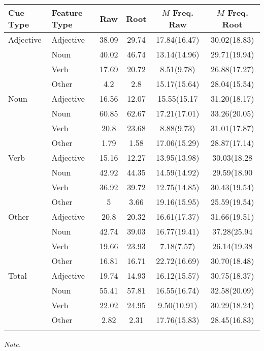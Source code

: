 \documentclass[english,man]{apa6}
\theoremstyle{definition}
\theoremstyle{definition}
\theoremstyle{definition}
\theoremstyle{remark}
\begin{document}
\begin{table}[tbp]
\begin{center}
\begin{threeparttable}
\caption{\label{tab:unnamed-chunk-5}}
\begin{tabular}{llcccc}
\toprule
Cue Type & Feature Type & Raw & Root & $M$ Freq. Raw & $M$ Freq. Root\\
\midrule
Adjective & Adjective & 38.09 & 29.74 & 17.84(16.47) & 30.02(18.83)\\
 & Noun & 40.02 & 46.74 & 13.14(14.96) & 29.71(19.94)\\
 & Verb & 17.69 & 20.72 & 8.51(9.78) & 26.88(17.27)\\
 & Other & 4.2 & 2.8 & 15.17(15.64) & 28.04(15.54)\\
Noun & Adjective & 16.56 & 12.07 & 15.55(15.17 & 31.20(18.17)\\
 & Noun & 60.85 & 62.67 & 17.21(17.01) & 33.26(20.05)\\
 & Verb & 20.8 & 23.68 & 8.88(9.73) & 31.01(17.87)\\
 & Other & 1.79 & 1.58 & 17.06(15.29) & 28.87(17.14)\\
Verb & Adjective & 15.16 & 12.27 & 13.95(13.98) & 30.03(18.28\\
 & Noun & 42.92 & 44.35 & 14.59(14.92) & 29.59(18.90\\
 & Verb & 36.92 & 39.72 & 12.75(14.85) & 30.43(19.54)\\
 & Other & 5 & 3.66 & 19.16(15.95) & 25.59(19.54)\\
Other & Adjective & 20.8 & 20.32 & 16.61(17.37) & 31.66(19.51)\\
 & Noun & 42.74 & 39.03 & 16.77(19.41) & 37.28(25.94\\
 & Verb & 19.66 & 23.93 & 7.18(7.57) & 26.14(19.38\\
 & Other & 16.81 & 16.71 & 22.72(16.69) & 30.70(18.48)\\
Total & Adjective & 19.74 & 14.93 & 16.12(15.57) & 30.75(18.37)\\
 & Noun & 55.41 & 57.81 & 16.55(16.74) & 32.58(20.09)\\
 & Verb & 22.02 & 24.95 & 9.50(10.91) & 30.29(18.24)\\
 & Other & 2.82 & 2.31 & 17.76(15.83) & 28.45(16.83)\\
\bottomrule
\addlinespace
\end{tabular}
\begin{tablenotes}[para]
\textit{Note.} 
\end{tablenotes}
\end{threeparttable}
\end{center}
\end{table}
\end{document}
